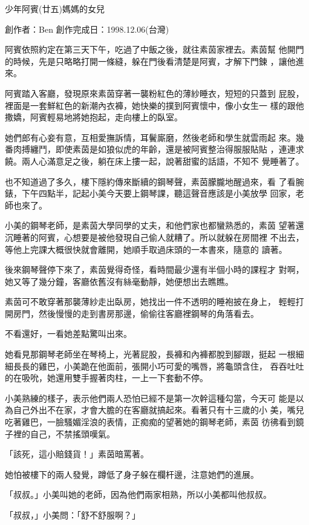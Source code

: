 



少年阿賓(廿五)媽媽的女兒

創作者：Ben
創作完成日：1998.12.06(台灣)


阿賓依照約定在第三天下午，吃過了中飯之後，就往素茵家裡去。素茵幫
他開門的時候，先是只略略打開一條縫，躲在門後看清楚是阿賓，才解下門鍊
，讓他進來。

阿賓踏入客廳，發現原來素茵穿著一襲粉紅色的薄紗睡衣，短短的只蓋到
屁股，裡面是一套鮮紅色的新潮內衣褲，她快樂的撲到阿賓懷中，像小女生一
樣的跟他撒嬌，阿賓輕易地將她抱起，走向樓上的臥室。

她們郎有心妾有意，互相愛撫訴情，耳鬢廝磨，然後老師和學生就雲雨起
來。幾番肉搏纏鬥，即使素茵是如狼似虎的年齡，還是被阿賓整治得服服貼貼
，連連求饒。兩人心滿意足之後，躺在床上摟一起，說著甜蜜的話語，不知不
覺睡著了。

也不知道過了多久，樓下隱約傳來斷續的鋼琴聲，素茵朦朧地醒過來，看
了看腕錶，下午四點半，記起小美今天要上鋼琴課，聽這聲音應該是小美放學
回家，老師也來了。

小美的鋼琴老師，是素茵大學同學的丈夫，和他們家也都蠻熟悉的，素茵
望著還沉睡著的阿賓，心想要是被他發現自己偷人就糟了。所以就躲在房間裡
不出去，等他上完課大概很快就會離開，她順手取過床頭的一本書來，隨意的
讀著。

後來鋼琴聲停下來了，素茵覺得奇怪，看時間最少還有半個小時的課程才
對啊，她又等了幾分鐘，客廳依舊沒有絲毫動靜，她便想出去瞧瞧。

素茵可不敢穿著那襲薄紗走出臥房，她找出一件不透明的睡袍披在身上，
輕輕打開房門，然後慢慢的走到書房那邊，偷偷往客廳裡鋼琴的角落看去。

不看還好，一看她差點驚叫出來。

她看見那鋼琴老師坐在琴椅上，光著屁股，長褲和內褲都脫到腳跟，挺起
一根細細長長的雞巴，小美跪在他面前，張開小巧可愛的嘴唇，將龜頭含住，
吞吞吐吐的在吸吮，她還用雙手握著肉柱，一上一下套動不停。

小美熟練的樣子，表示他們兩人恐怕已經不是第一次幹這種勾當，今天可
能是以為自己外出不在家，才會大膽的在客廳就搞起來。看著只有十三歲的小
美，嘴兒吃著雞巴，一臉騷媚淫浪的表情，正痴痴的望著她的鋼琴老師，素茵
彷彿看到鏡子裡的自己，不禁搖頭嘆氣。

「該死，這小賠錢貨！」素茵暗罵著。

她怕被樓下的兩人發覺，蹲低了身子躲在欄杆邊，注意她們的進展。

「叔叔。」小美叫她的老師，因為他們兩家相熟，所以小美都叫他叔叔。

「叔叔，」小美問：「舒不舒服啊？」

